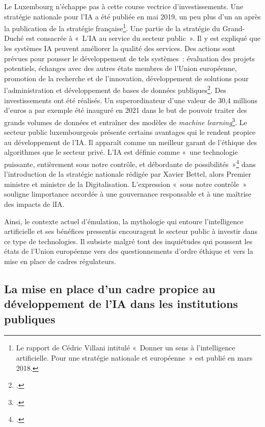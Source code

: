 Le Luxembourg n'échappe pas à cette course vectrice d'investissements.
Une stratégie nationale pour l'IA a été publiée en mai 2019, un peu plus
d'un an après la publication de la stratégie française\footnote{Le
	rapport de Cédric Villani intitulé «~Donner un sens à l'intelligence
	artificielle. Pour une stratégie nationale et européenne~» est publié
	en mars 2018.}. Une partie de la stratégie du Grand-Duché est
consacrée à «~L'IA au service du secteur public~». Il y est expliqué que
les systèmes IA peuvent améliorer la qualité des services. Des actions
sont prévues pour pousser le développement de tels systèmes~: évaluation
des projets potentiels, échanges avec des autres états membres de
l'Union européenne, promotion de la recherche et de l'innovation,
développement de solutions pour l'administration et développement de
bases de données publiques\footcite{noauthor_intelligence_2019}. Des investissements ont été
réalisés. Un superordinateur d'une valeur de 30,4 millions d'euros a par
exemple été inauguré en 2021 dans le but de pouvoir traiter des grands
volumes de données et entraîner des modèles de \emph{machine learning}\footcite{noauthor_meluxina_2023}.
Le secteur public luxembourgeois présente certains avantages qui le
rendent propice au développement de l'IA. Il apparaît comme un meilleur
garant de l'éthique des algorithmes que le secteur privé. L'IA est
définie comme «~une technologie puissante, entièrement sous notre
contrôle, et débordante de possibilités~»\footcite{noauthor_intelligence_2019} dans
l'introduction de la stratégie nationale rédigée par Xavier Bettel,
alors Premier ministre et ministre de la Digitalisation. L'expression
«~sous notre contrôle~» souligne l\textquotesingle importance accordée à
une gouvernance responsable et à une maîtrise des impacts de
l\textquotesingle IA. 

Ainsi, le contexte actuel d'émulation, la mythologie qui entoure
l'intelligence artificielle et ses bénéfices pressentis encouragent le
secteur public à investir dans ce type de technologies. Il subsiste
malgré tout des inquiétudes qui poussent les états de l'Union européenne
vers des questionnements d'ordre éthique et vers la mise en place de
cadres régulateurs.


\subsection{La mise en place d'un cadre propice au développement de l'IA dans les institutions publiques}

